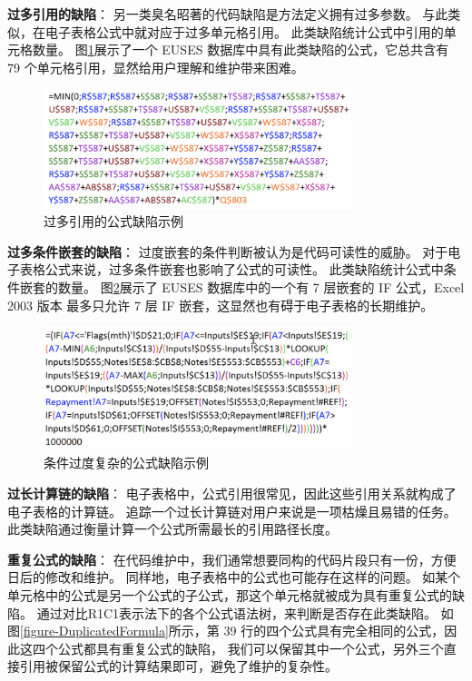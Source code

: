 \textbf{过多引用的缺陷}：
另一类臭名昭著的代码缺陷是方法定义拥有过多参数。
与此类似，在电子表格公式中就对应于过多单元格引用。
此类缺陷统计公式中引用的单元格数量。
图\ref{figure-multipleReference}展示了一个 EUSES 数据库中具有此类缺陷的公式，它总共含有 79 个单元格引用，显然给用户理解和维护带来困难。

\begin{figure}[tbp]    
    \centering
    \includegraphics[width=0.8\textwidth]{figure/relatedwork/multipleReference.png}
    \caption{过多引用的公式缺陷示例}
    \label{figure-multipleReference}
\end{figure}

\textbf{过多条件嵌套的缺陷}：
过度嵌套的条件判断被认为是代码可读性的威胁\cite{fowler1997refactoring}。
对于电子表格公式来说，过多条件嵌套也影响了公式的可读性。
此类缺陷统计公式中条件嵌套的数量。
图\ref{figure-ConditionalComplexity}展示了 EUSES 数据库中的一个有 7 层嵌套的 IF 公式，Excel 2003 版本 最多只允许 7 层 IF 嵌套，这显然也有碍于电子表格的长期维护。

\begin{figure}[tbp]    
    \centering
    \includegraphics[width=0.8\textwidth]{figure/relatedwork/ConditionalComplexity.png}
    \caption{条件过度复杂的公式缺陷示例}
    \label{figure-ConditionalComplexity}
\end{figure}

\textbf{过长计算链的缺陷}：
电子表格中，公式引用很常见，因此这些引用关系就构成了电子表格的计算链。
追踪一个过长计算链对用户来说是一项枯燥且易错的任务。
此类缺陷通过衡量计算一个公式所需最长的引用路径长度。

\textbf{重复公式的缺陷}：
在代码维护中，我们通常想要同构的代码片段只有一份，方便日后的修改和维护。
同样地，电子表格中的公式也可能存在这样的问题。
如某个单元格中的公式是另一个公式的子公式，那这个单元格就被成为具有重复公式的缺陷。
通过对比R1C1表示法下的各个公式语法树，来判断是否存在此类缺陷。
如图\ref{figure-DuplicatedFormula}所示，第 39 行的四个公式具有完全相同的公式，因此这四个公式都具有重复公式的缺陷，
我们可以保留其中一个公式，另外三个直接引用被保留公式的计算结果即可，避免了维护的复杂性。

